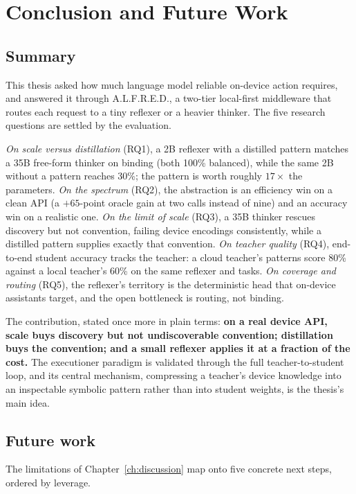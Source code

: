 \chapter{Conclusion and Future Work}
\label{ch:conclusion}

\section{Summary}
\label{sec:c-summary}

This thesis asked how much language model reliable on-device action requires, and
answered it through A.L.F.R.E.D., a two-tier local-first middleware that routes
each request to a tiny reflexer or a heavier thinker. The five research questions
are settled by the evaluation.

\emph{On scale versus distillation} (RQ1), a 2B reflexer with a distilled pattern
matches a 35B free-form thinker on binding (both 100\% balanced), while the same
2B without a pattern reaches 30\%; the pattern is worth roughly $17\times$ the
parameters. \emph{On the spectrum} (RQ2), the abstraction is an efficiency win on
a clean API (a $+65$-point oracle gain at two calls instead of nine) and an
accuracy win on a realistic one. \emph{On the limit of scale} (RQ3), a 35B thinker
rescues discovery but not convention, failing device encodings consistently, while
a distilled pattern supplies exactly that convention. \emph{On teacher quality}
(RQ4), end-to-end student accuracy tracks the teacher: a cloud teacher's patterns
score 80\% against a local teacher's 60\% on the same reflexer and tasks. \emph{On
coverage and routing} (RQ5), the reflexer's territory is the deterministic head
that on-device assistants target, and the open bottleneck is routing, not binding.

The contribution, stated once more in plain terms: \textbf{on a real device API,
scale buys discovery but not undiscoverable convention; distillation buys the
convention; and a small reflexer applies it at a fraction of the cost.} The
executioner paradigm is validated through the full teacher-to-student loop, and
its central mechanism, compressing a teacher's device knowledge into an
inspectable symbolic pattern rather than into student weights, is the thesis's
main idea.

\section{Future work}
\label{sec:c-future}

The limitations of Chapter~\ref{ch:discussion} map onto five concrete next steps,
ordered by leverage.

